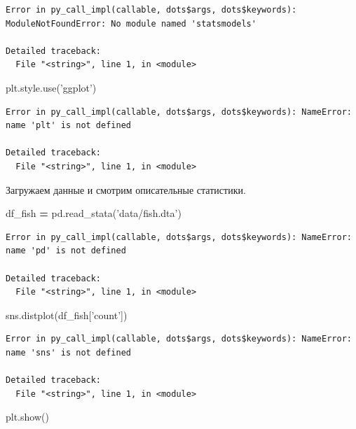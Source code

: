 \documentclass[]{book}
\newenvironment{Shaded}{\begin{snugshade}}{\end{snugshade}}
\newcommand{\NormalTok}[1]{#1}
\newcommand{\OperatorTok}[1]{\textcolor[rgb]{0.81,0.36,0.00}{\textbf{#1}}}
\newcommand{\StringTok}[1]{\textcolor[rgb]{0.31,0.60,0.02}{#1}}
\begin{document}
\begin{verbatim}
Error in py_call_impl(callable, dots$args, dots$keywords): ModuleNotFoundError: No module named 'statsmodels'

Detailed traceback: 
  File "<string>", line 1, in <module>
\end{verbatim}

\begin{Shaded}
\begin{Highlighting}[]
\NormalTok{plt.style.use(}\StringTok{'ggplot'}\NormalTok{)}
\end{Highlighting}
\end{Shaded}

\begin{verbatim}
Error in py_call_impl(callable, dots$args, dots$keywords): NameError: name 'plt' is not defined

Detailed traceback: 
  File "<string>", line 1, in <module>
\end{verbatim}

Загружаем данные и смотрим описательные статистики.

\begin{Shaded}
\begin{Highlighting}[]
\NormalTok{df_fish }\OperatorTok{=}\NormalTok{ pd.read_stata(}\StringTok{'data/fish.dta'}\NormalTok{)}
\end{Highlighting}
\end{Shaded}

\begin{verbatim}
Error in py_call_impl(callable, dots$args, dots$keywords): NameError: name 'pd' is not defined

Detailed traceback: 
  File "<string>", line 1, in <module>
\end{verbatim}

\begin{Shaded}
\begin{Highlighting}[]
\NormalTok{sns.distplot(df_fish[}\StringTok{'count'}\NormalTok{])}
\end{Highlighting}
\end{Shaded}

\begin{verbatim}
Error in py_call_impl(callable, dots$args, dots$keywords): NameError: name 'sns' is not defined

Detailed traceback: 
  File "<string>", line 1, in <module>
\end{verbatim}

\begin{Shaded}
\begin{Highlighting}[]
\NormalTok{plt.show()}
\end{Highlighting}
\end{Shaded}
\end{document}

